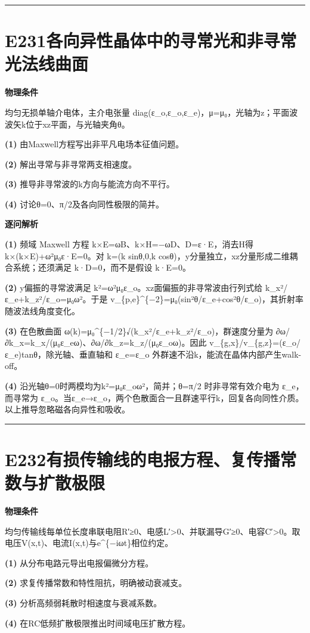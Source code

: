 \documentclass[UTF8,a4paper,11pt,oneside,openany]{ctexbook}
\begin{document}
\par\bigskip\hrule\bigskip
\section*{E231\quad 各向异性晶体中的寻常光和非寻常光法线曲面}
\textbf{物理条件}\par 均匀无损单轴介电体，主介电张量 diag(ε\_o,ε\_o,ε\_e)，μ=μ₀，光轴为z；平面波波矢k位于xz平面，与光轴夹角θ。
\par\noindent\textbf{(1)} 由Maxwell方程写出非平凡电场本征值问题。
\par\noindent\textbf{(2)} 解出寻常与非寻常两支相速度。
\par\noindent\textbf{(3)} 推导非寻常波的k方向与能流方向不平行。
\par\noindent\textbf{(4)} 讨论θ=0、π/2及各向同性极限的简并。

\par\medskip\noindent\textbf{逐问解析}
\par\noindent\textbf{(1)} 频域 Maxwell 方程 k×E=ωB、k×H=−ωD、D=ε·E，消去H得 k×(k×E)+ω²μ₀ε·E=0。对 k=(k sinθ,0,k cosθ)，y分量独立，xz分量形成二维耦合系统；还须满足 k·D=0，而不是假设 k·E=0。
\par\noindent\textbf{(2)} y偏振的寻常波满足 k²=ω²μ₀ε\_o。xz面偏振的非寻常波由行列式给 k\_x²/ε\_e+k\_z²/ε\_o=μ₀ω²。于是 v\_\{p,e\}\textasciicircum{}\{−2\}=μ₀(sin²θ/ε\_e+cos²θ/ε\_o)，其折射率随波法线角度变化。
\par\noindent\textbf{(3)} 在色散曲面 ω(k)=μ₀\textasciicircum{}\{−1/2\}√(k\_x²/ε\_e+k\_z²/ε\_o)，群速度分量为 ∂ω/∂k\_x=k\_x/(μ₀ε\_eω)、∂ω/∂k\_z=k\_z/(μ₀ε\_oω)。因此 v\_\{g,x\}/v\_\{g,z\}=(ε\_o/ε\_e)tanθ，除光轴、垂直轴和 ε\_e=ε\_o 外群速不沿k，能流在晶体内部产生walk-off。
\par\noindent\textbf{(4)} 沿光轴θ=0时两模均为k²=μ₀ε\_oω²，简并；θ=π/2 时非寻常有效介电为 ε\_e，而寻常为 ε\_o。当ε\_e→ε\_o，两个色散面合一且群速平行k，回复各向同性介质。以上推导忽略磁各向异性和吸收。

\par\bigskip\hrule\bigskip
\section*{E232\quad 有损传输线的电报方程、复传播常数与扩散极限}
\textbf{物理条件}\par 均匀传输线每单位长度串联电阻R′≥0、电感L′>0、并联漏导G′≥0、电容C′>0。取电压V(x,t)、电流I(x,t)与e\textasciicircum{}\{−iωt\}相位约定。
\par\noindent\textbf{(1)} 从分布电路元导出电报偏微分方程。
\par\noindent\textbf{(2)} 求复传播常数和特性阻抗，明确被动衰减支。
\par\noindent\textbf{(3)} 分析高频弱耗散时相速度与衰减系数。
\par\noindent\textbf{(4)} 在RC低频扩散极限推出时间域电压扩散方程。
\end{document}
